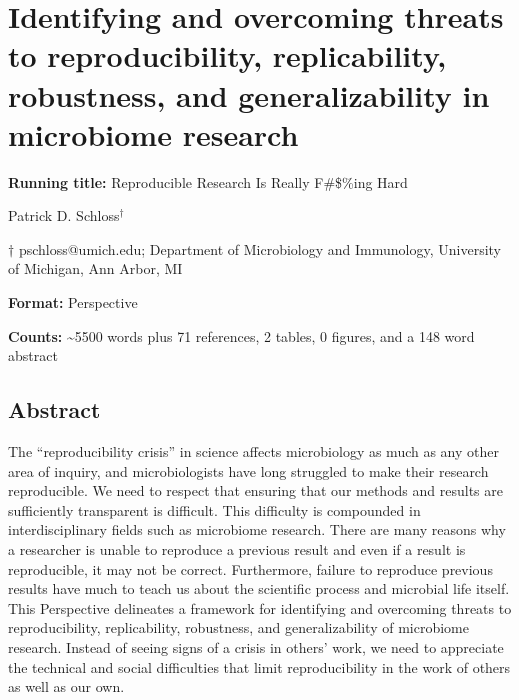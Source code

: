 \documentclass[]{article}
\date{}
\begin{document}
\section{Identifying and overcoming threats to reproducibility,
replicability, robustness, and generalizability in microbiome
research}\label{identifying-and-overcoming-threats-to-reproducibility-replicability-robustness-and-generalizability-in-microbiome-research}

\textbf{Running title:} Reproducible Research Is Really F\#\$\%ing Hard

\vspace{25mm} Patrick D. Schloss\({^\dagger}\)

\vspace{30mm}

\(\dagger\) pschloss@umich.edu; Department of Microbiology and
Immunology, University of Michigan, Ann Arbor, MI

\vspace{30mm}

\textbf{Format:} Perspective

\textbf{Counts:} \textasciitilde 5500 words plus 71 references, 2
tables, 0 figures, and a 148 word abstract

\newpage

\linenumbers

\subsection{Abstract}\label{abstract}

The ``reproducibility crisis'' in science affects microbiology as much
as any other area of inquiry, and microbiologists have long struggled to
make their research reproducible. We need to respect that ensuring that
our methods and results are sufficiently transparent is difficult. This
difficulty is compounded in interdisciplinary fields such as microbiome
research. There are many reasons why a researcher is unable to reproduce
a previous result and even if a result is reproducible, it may not be
correct. Furthermore, failure to reproduce previous results have much to
teach us about the scientific process and microbial life itself. This
Perspective delineates a framework for identifying and overcoming
threats to reproducibility, replicability, robustness, and
generalizability of microbiome research. Instead of seeing signs of a
crisis in others' work, we need to appreciate the technical and social
difficulties that limit reproducibility in the work of others as well as
our own.
\end{document}
